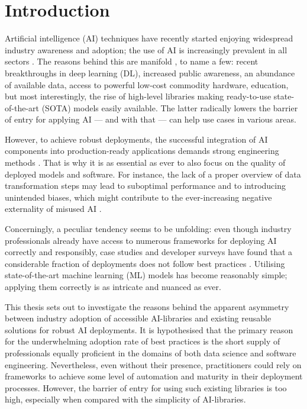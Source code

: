 \chapter{Introduction}

Artificial intelligence (AI) techniques have recently started enjoying widespread industry awareness and adoption; the use of AI is increasingly prevalent in all sectors \cite{wirtz2019artificial,bosch2021engineering}. The reasons behind this are manifold \cite{jordan2015machine}, to name a few: recent breakthroughs in deep learning (DL), increased public awareness, an abundance of available data, access to powerful low-cost commodity hardware, education, but most interestingly, the rise of high-level libraries making ready-to-use state-of-the-art (SOTA) models easily available. The latter radically lowers the barrier of entry for applying AI --- and with that --- can help use cases in various areas. 

However, to achieve robust deployments, the successful integration of AI components into production-ready applications demands strong engineering methods \cite{serban2020adoption}. That is why it is as essential as ever to also focus on the quality of deployed models and software. For instance, the lack of a proper overview of data transformation steps may lead to suboptimal performance and to introducing unintended biases, which might contribute to the ever-increasing negative externality of misused AI \cite{o2016weapons}.

Concerningly, a peculiar tendency seems to be unfolding: even though industry professionals already have access to numerous frameworks for deploying AI correctly and responsibly, case studies and developer surveys have found that a considerable fraction of deployments does not follow best practices \cite{serban2020adoption,haakman2021ai,amershi2019software,de2019understanding,sculley2015hidden}. Utilising state-of-the-art machine learning (ML) models has become reasonably simple; applying them correctly is as intricate and nuanced as ever. 

This thesis sets out to investigate the reasons behind the apparent asymmetry between industry adoption of accessible AI-libraries and existing reusable solutions for robust AI deployments. It is hypothesised that the primary reason for the underwhelming adoption rate of best practices is the short supply of professionals equally proficient in the domains of both data science and software engineering. Nevertheless, even without their presence, practitioners could rely on frameworks to achieve some level of automation and maturity in their deployment processes. However, the barrier of entry for using such existing libraries is too high, especially when compared with the simplicity of AI-libraries.

